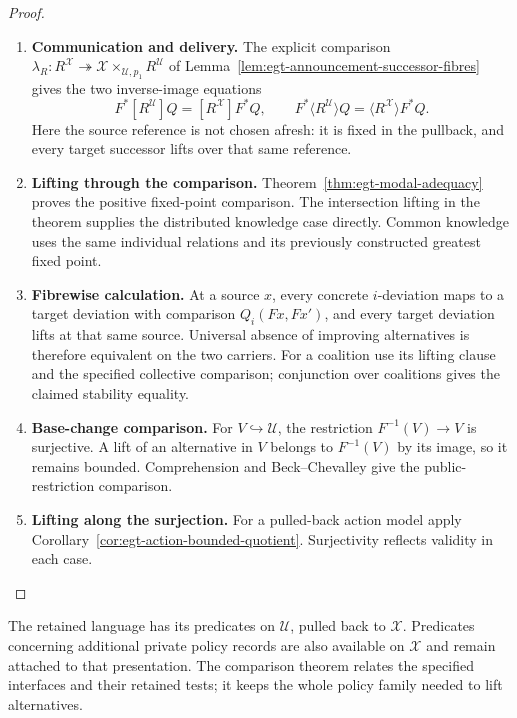 \documentclass[11pt,a4paper]{article}
\numberwithin{equation}{section}
\theoremstyle{definition}
\theoremstyle{remark}
\theoremstyle{plain}
\begin{document}
\begin{proof}
\leavevmode
\begin{enumerate}[label=\textup{(\arabic*)},leftmargin=*,itemsep=4pt,topsep=3pt]
  \item \textbf{Communication and delivery.} The explicit comparison
$\lambda_R:R^{\mathcal X}\twoheadrightarrow
 \mathcal X\times_{\mathcal U,p_1}R^{\mathcal U}$
of Lemma~\ref{lem:egt-announcement-successor-fibres} gives the two
inverse-image equations
\[
 F^*[R^{\mathcal U}]Q=[R^{\mathcal X}]F^*Q,
 \qquad
 F^*\langle R^{\mathcal U}\rangle Q
    =\langle R^{\mathcal X}\rangle F^*Q.
\]
Here the source reference is not chosen afresh: it is fixed in the
pullback, and every target successor lifts over that same reference.
  \item \textbf{Lifting through the comparison.} Theorem~\ref{thm:egt-modal-adequacy} proves the positive fixed-point
comparison. The intersection lifting in the theorem supplies the distributed
knowledge case directly. Common knowledge uses the same individual
relations and its previously constructed greatest fixed point.
  \item \textbf{Fibrewise calculation.} At a source $x$, every concrete $i$-deviation maps to a target deviation
with comparison $Q_i(Fx,Fx')$, and every target deviation lifts at that same
source. Universal absence of improving alternatives is therefore equivalent
on the two carriers. For a coalition use its lifting clause and the specified
collective comparison; conjunction over coalitions gives the claimed
stability equality.
  \item \textbf{Base-change comparison.} For $V\hookrightarrow\mathcal U$, the restriction
$F^{-1}(V)\to V$ is surjective. A lift of an alternative in $V$ belongs to
$F^{-1}(V)$ by its image, so it remains bounded. Comprehension and
Beck--Chevalley give the public-restriction comparison.
  \item \textbf{Lifting along the surjection.} For a pulled-back
action model apply Corollary~\ref{cor:egt-action-bounded-quotient}. Surjectivity reflects validity in each case.
\end{enumerate}
\end{proof}


The retained language has its predicates on $\mathcal U$, pulled back to
$\mathcal X$. Predicates concerning additional private policy records are
also available on $\mathcal X$ and remain attached to that presentation.
The comparison theorem relates the specified interfaces and their retained
tests; it keeps the whole policy family needed to lift alternatives.
\end{document}
